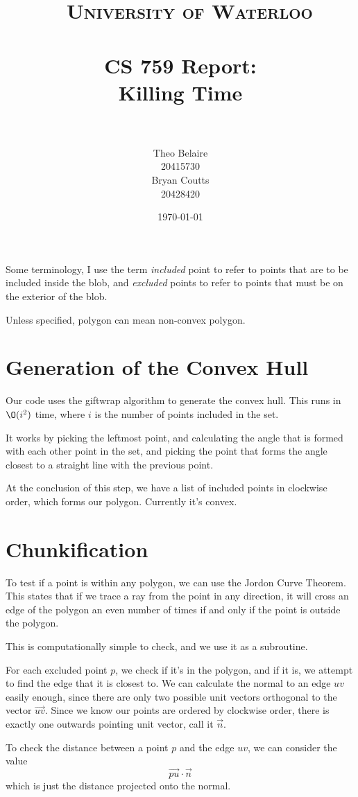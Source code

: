 \documentclass[paper=a4, fontsize=11pt]{scrartcl} %
\title{\
    \normalfont\normalsize
    \textsc{University of Waterloo} \\ [25pt] %
    \horrule{0.5pt} \\[0.4cm] %
    \huge CS 759 Report:\\
    Killing Time \\
    \horrule{2pt} \\[0.5cm] %
}
\author{Theo Belaire \\ 20415730 \\ Bryan Coutts \\ 20428420} %
\date{\normalsize\today} %
\numberwithin{equation}{section} %
\numberwithin{figure}{section} %
\numberwithin{table}{section} %
\begin{document}
\maketitle %


Some terminology, I use the term \textit{included} point to refer to points
that are to be included inside the blob, and \textit{excluded} points to refer
to points that must be on the exterior of the blob.

Unless specified, polygon can mean non-convex polygon.


\section{Generation of the Convex Hull}
Our code uses the giftwrap algorithm to generate the convex hull.
This runs in $\O(i^2)$ time, where $i$ is the number of points included in the
set.

It works by picking the leftmost point, and calculating the angle that is
formed with each other point in the set, and picking the point that forms
the angle closest to a straight line with the previous point.

At the conclusion of this step, we have a list of included points in clockwise
order, which forms our polygon.  Currently it's convex.

\section{Chunkification}
To test if a point is within any polygon, we can use the Jordon Curve Theorem.
This states that if we trace a ray from the point in any direction, it
will cross an edge of the polygon an even number of times if and only if
the point is outside the polygon.

This is computationally simple to check, and we use it as a subroutine.

For each excluded point $p$, we check if it's in the polygon, and if it is,
we attempt to find the edge that it is closest to.
We can calculate the normal to an edge $uv$ easily enough, since there are
only two possible unit vectors orthogonal to the vector $\vec{uv}$.  Since
we know our points are ordered by clockwise order, there is exactly one outwards
pointing unit vector, call it $\vec{n}$.

To check the distance between a point $p$ and the edge 
$uv$, we can consider the value
\[ \vec{pu} \cdot \vec{n} \]
which is just the distance projected onto the normal.
\end{document}
